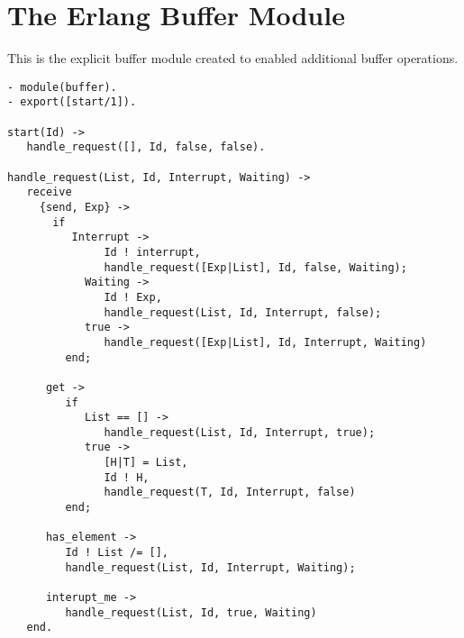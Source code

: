 \chapter{The Erlang Buffer Module}
\label{appsec:buffer}
This is the explicit buffer module created to enabled additional buffer operations.

\footnotesize
\begin{verbatim}
- module(buffer).
- export([start/1]).

start(Id) ->
   handle_request([], Id, false, false).

handle_request(List, Id, Interrupt, Waiting) ->
   receive
     {send, Exp} ->
       if
          Interrupt ->
               Id ! interrupt,
               handle_request([Exp|List], Id, false, Waiting);
            Waiting ->
               Id ! Exp,
               handle_request(List, Id, Interrupt, false);
            true ->
               handle_request([Exp|List], Id, Interrupt, Waiting)
         end;

      get ->
         if 
            List == [] -> 
               handle_request(List, Id, Interrupt, true);
            true ->
               [H|T] = List,
               Id ! H,
               handle_request(T, Id, Interrupt, false)
         end;

      has_element ->
         Id ! List /= [],
         handle_request(List, Id, Interrupt, Waiting);

      interupt_me ->
         handle_request(List, Id, true, Waiting)     
   end.   
\end{verbatim}
\normalsize